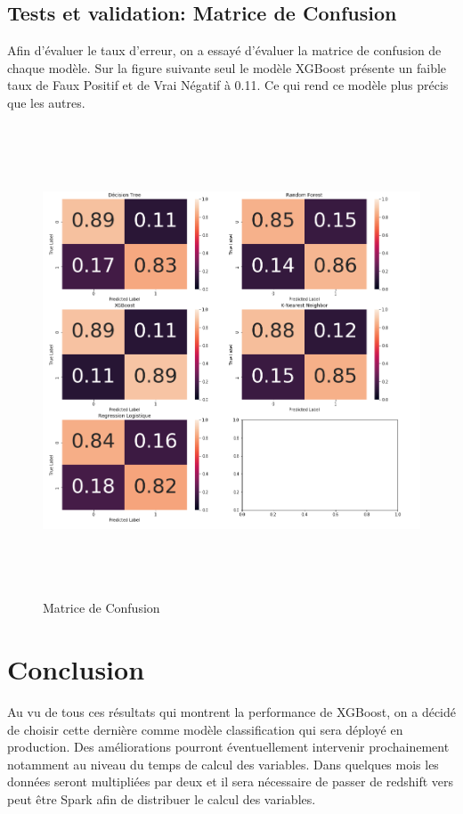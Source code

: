 \subsection{Tests et validation: Matrice de Confusion}
Afin d’évaluer le taux d’erreur, on a essayé d’évaluer la matrice de confusion de chaque modèle. Sur la figure suivante seul le modèle XGBoost présente un faible taux de Faux Positif et de Vrai Négatif à 0.11. Ce qui rend ce modèle plus précis que les autres.
\begin{figure}[h]
\begin{center}
\includegraphics[width=15cm,height=14cm]{images/confusion_matrix.png}
\caption[Matrice de Confusion]{Matrice de Confusion}
\label{monlabel}
\end{center}
\end{figure}
\newpage

\section{Conclusion}
Au vu de tous ces résultats qui montrent la performance de XGBoost, on a décidé de choisir cette dernière comme modèle classification qui sera déployé en production. Des améliorations pourront éventuellement intervenir prochainement notamment au niveau du temps de calcul des variables. Dans quelques mois les données seront multipliées par deux et il sera nécessaire de passer de redshift vers peut être Spark afin de distribuer le calcul des variables. 